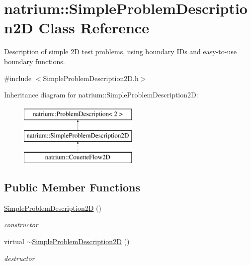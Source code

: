 \hypertarget{classnatrium_1_1SimpleProblemDescription2D}{\section{natrium\-:\-:\-Simple\-Problem\-Description2\-D \-Class \-Reference}
\label{classnatrium_1_1SimpleProblemDescription2D}
}


\-Description of simple 2\-D test problems, using boundary \-I\-Ds and easy-\/to-\/use boundary functions.  




{\ttfamily \#include $<$\-Simple\-Problem\-Description2\-D.\-h$>$}

\-Inheritance diagram for natrium\-:\-:\-Simple\-Problem\-Description2\-D\-:\begin{figure}[H]
\begin{center}
\leavevmode
\includegraphics[height=3.000000cm]{classnatrium_1_1SimpleProblemDescription2D}
\end{center}
\end{figure}
\subsection*{\-Public \-Member \-Functions}
\begin{DoxyCompactItemize}
\item 
\hypertarget{classnatrium_1_1SimpleProblemDescription2D_a8b9dbf9876673e9b03bc4fa4a95036b4}{\hyperlink{classnatrium_1_1SimpleProblemDescription2D_a8b9dbf9876673e9b03bc4fa4a95036b4}{\-Simple\-Problem\-Description2\-D} ()}\label{classnatrium_1_1SimpleProblemDescription2D_a8b9dbf9876673e9b03bc4fa4a95036b4}

\begin{DoxyCompactList}\small\item\em constructor \end{DoxyCompactList}\item 
\hypertarget{classnatrium_1_1SimpleProblemDescription2D_a350cd6fd7ee17aed498659d51088e3e1}{virtual \hyperlink{classnatrium_1_1SimpleProblemDescription2D_a350cd6fd7ee17aed498659d51088e3e1}{$\sim$\-Simple\-Problem\-Description2\-D} ()}\label{classnatrium_1_1SimpleProblemDescription2D_a350cd6fd7ee17aed498659d51088e3e1}

\begin{DoxyCompactList}\small\item\em destructor \end{DoxyCompactList}\end{DoxyCompactItemize}



